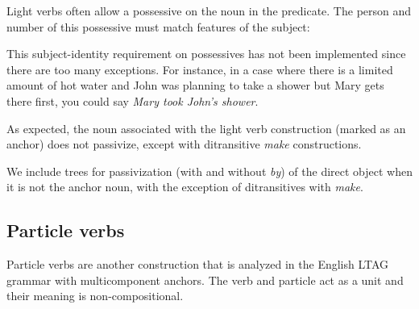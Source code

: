 Light verbs often allow a possessive on the noun in the predicate.  The
person and number of this possessive must match features of the subject:



This subject-identity requirement on possessives has not been implemented
since there are too many exceptions.  For instance, in a case where there
is a limited amount of hot water and John was planning to take a shower but
Mary gets there first, you could say {\it Mary took John's shower}.

\vspace{0.5in}  \vspace{0.25in}

As expected, the noun associated with the light verb construction (marked
as an anchor) does not passivize, except with ditransitive {\it make}
constructions.





We include trees for passivization (with and without {\it by}) of the
direct object when it is not the anchor noun, with the exception of
ditransitives with {\it make}.

\subsection{Particle verbs}
Particle verbs are another construction that is analyzed in the
English LTAG grammar with multicomponent anchors. The verb and particle act as a unit and their meaning is non-compositional.  



